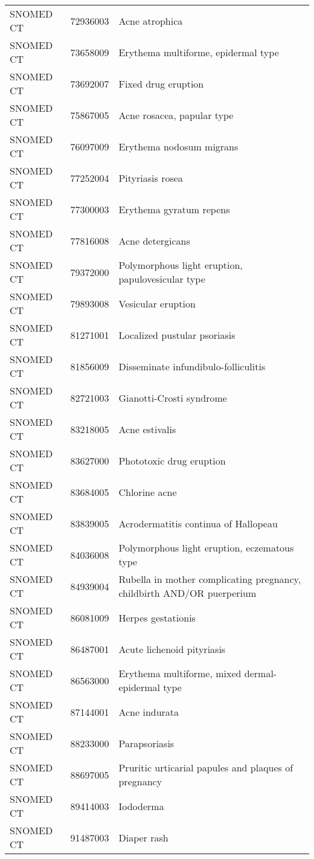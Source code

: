 \begin{longtable}{p{}p{}p{}}
  SNOMED CT & 72936003 & Acne atrophica \\ 
  SNOMED CT & 73658009 & Erythema multiforme, epidermal type \\ 
  SNOMED CT & 73692007 & Fixed drug eruption \\ 
  SNOMED CT & 75867005 & Acne rosacea, papular type \\ 
  SNOMED CT & 76097009 & Erythema nodosum migrans \\ 
  SNOMED CT & 77252004 & Pityriasis rosea \\ 
  SNOMED CT & 77300003 & Erythema gyratum repens \\ 
  SNOMED CT & 77816008 & Acne detergicans \\ 
  SNOMED CT & 79372000 & Polymorphous light eruption, papulovesicular type \\ 
  SNOMED CT & 79893008 & Vesicular eruption \\ 
  SNOMED CT & 81271001 & Localized pustular psoriasis \\ 
  SNOMED CT & 81856009 & Disseminate infundibulo-folliculitis \\ 
  SNOMED CT & 82721003 & Gianotti-Crosti syndrome \\ 
  SNOMED CT & 83218005 & Acne estivalis \\ 
  SNOMED CT & 83627000 & Phototoxic drug eruption \\ 
  SNOMED CT & 83684005 & Chlorine acne \\ 
  SNOMED CT & 83839005 & Acrodermatitis continua of Hallopeau \\ 
  SNOMED CT & 84036008 & Polymorphous light eruption, eczematous type \\ 
  SNOMED CT & 84939004 & Rubella in mother complicating pregnancy, childbirth AND/OR puerperium \\ 
  SNOMED CT & 86081009 & Herpes gestationis \\ 
  SNOMED CT & 86487001 & Acute lichenoid pityriasis \\ 
  SNOMED CT & 86563000 & Erythema multiforme, mixed dermal-epidermal type \\ 
  SNOMED CT & 87144001 & Acne indurata \\ 
  SNOMED CT & 88233000 & Parapsoriasis \\ 
  SNOMED CT & 88697005 & Pruritic urticarial papules and plaques of pregnancy \\ 
  SNOMED CT & 89414003 & Iododerma \\ 
  SNOMED CT & 91487003 & Diaper rash \\ 

\end{longtable}
